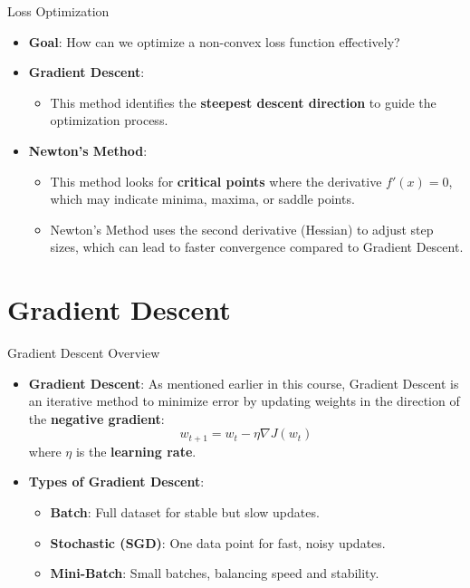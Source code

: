 \documentclass[serif, aspectratio=169]{beamer}
\begin{document}
\begin{frame}{Loss Optimization}
    \begin{itemize}
        \item \textbf{Goal}: How can we optimize a non-convex loss function effectively?
        \item \textbf{Gradient Descent}:
        \begin{itemize}
            \item This method identifies the \textbf{steepest descent direction} to guide the optimization process.
        \end{itemize}
        \item \textbf{Newton's Method}:
        \begin{itemize}
            \item This method looks for \textbf{critical points} where the derivative \( f'(x) = 0 \), which may indicate minima, maxima, or saddle points.
            \item Newton's Method uses the second derivative (Hessian) to adjust step sizes, which can lead to faster convergence compared to Gradient Descent.
        \end{itemize}
    \end{itemize}
\end{frame}

\section{Gradient Descent}
\begin{frame}{Gradient Descent Overview}
    \begin{itemize}
        \item \textbf{Gradient Descent}: As mentioned earlier in this course, Gradient Descent is an iterative method to minimize error by updating weights in the direction of the \textbf{negative gradient}:
        \[
        w_{t+1} = w_t - \eta \nabla J(w_t)
        \]
        where $\eta$ is the \textbf{learning rate}.
    \end{itemize}
    \begin{itemize}
        \item \textbf{Types of Gradient Descent}:
        \begin{itemize}
            \item \textbf{Batch}: Full dataset for stable but slow updates.
            \item \textbf{Stochastic (SGD)}: One data point for fast, noisy updates.
            \item \textbf{Mini-Batch}: Small batches, balancing speed and stability.
        \end{itemize}
    \end{itemize}
\end{frame}
\end{document}
